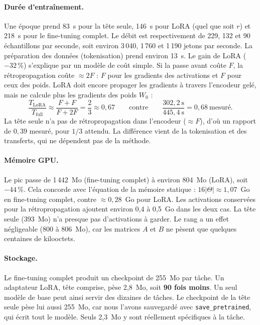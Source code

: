 \paragraph{Durée d'entraînement.} Une époque prend 83~s pour la tête seule, 146~s pour LoRA (quel que soit $r$) et 218~s pour le fine-tuning complet. Le débit est respectivement de 229, 132 et 90 échantillons par seconde, soit environ 3\,040, 1\,760 et 1\,190 jetons par seconde. La préparation des données (tokenisation) prend environ 13~s. Le gain de LoRA ($-32\,\%$) s'explique par un modèle de coût simple. Si la passe avant coûte $F$, la rétropropagation coûte $\approx2F$ : $F$ pour les gradients des activations et $F$ pour ceux des poids. LoRA doit encore propager les gradients à travers l'encodeur gelé, mais ne calcule plus les gradients des poids $W_0$ :
\begin{equation}
\frac{T_{\text{LoRA}}}{T_{\text{full}}}\approx\frac{F+F}{F+2F}=\frac23\approx0{,}67
\qquad\text{contre}\qquad \frac{302{,}2\ \text{s}}{445{,}4\ \text{s}}=0{,}68\ \text{mesuré.}
\end{equation}
La tête seule n'a pas de rétropropagation dans l'encodeur ($\approx F$), d'où un rapport de $0{,}39$ mesuré, pour $1/3$ attendu. La différence vient de la tokenisation et des transferts, qui ne dépendent pas de la méthode.

\paragraph{Mémoire GPU.} Le pic passe de 1\,442~Mo (fine-tuning complet) à environ 804~Mo (LoRA), soit $-44\,\%$. Cela concorde avec l'équation de la mémoire statique : $16|\Theta|\approx1{,}07$~Go en fine-tuning complet, contre $\approx0{,}28$~Go pour LoRA. Les activations conservées pour la rétropropagation ajoutent environ 0,4 à 0,5~Go dans les deux cas. La tête seule (393~Mo) n'a presque pas d'activations à garder. Le rang a un effet négligeable (800 à 806~Mo), car les matrices $A$ et $B$ ne pèsent que quelques centaines de kilooctets.

\paragraph{Stockage.} Le fine-tuning complet produit un checkpoint de 255~Mo par tâche. Un adaptateur LoRA, tête comprise, pèse 2,8~Mo, soit \textbf{90 fois moins}. Un seul modèle de base peut ainsi servir des dizaines de tâches. Le checkpoint de la tête seule pèse lui aussi 255~Mo, car nous l'avons sauvegardé avec \texttt{save\_pretrained}, qui écrit tout le modèle. Seuls 2,3~Mo y sont réellement spécifiques à la tâche.

